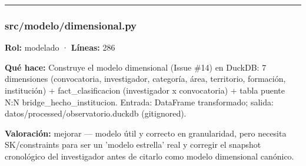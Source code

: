 \medskip
\hrule

\subsubsection{src/modelo/dimensional.py}
\textbf{Rol:} modelado · \textbf{Líneas:} 286

\textbf{Qué hace:} Construye el modelo dimensional (Issue \#14) en DuckDB: 7 dimensiones (convocatoria, investigador, categoría, área, territorio, formación, institución) + fact\_clasificacion (investigador x convocatoria) + tabla puente N:N bridge\_hecho\_institucion. Entrada: DataFrame transformado; salida: datos/processed/observatorio.duckdb (gitignored).

\textbf{Valoración:} mejorar --- modelo útil y correcto en granularidad, pero necesita SK/constraints para ser un 'modelo estrella' real y corregir el snapshot cronológico del investigador antes de citarlo como modelo dimensional canónico.

